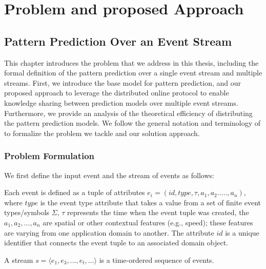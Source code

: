 \chapter{Problem and proposed Approach }
\label{chapter:system}
\section{Pattern Prediction Over an Event Stream}



This chapter introduces the problem that we address in this thesis, including the formal definition of the pattern prediction over a single event stream and multiple streams. First, we introduce the base model for pattern prediction, and our proposed approach to leverage the distributed online protocol to enable knowledge sharing between prediction models over multiple event streams. Furthermore, we provide an analysis of the theoretical efficiency of distributing the pattern prediction models.
We follow the general notation and terminology of \cite{agrawal2008efficient,schultz2009distributed,luckham2008power,alevizos2015complex,zhou_pattern_2015,kamp2014communication} to formalize the problem we tackle and our solution approach.

\subsection{Problem Formulation}

We first define the input event and the stream of events as follows:  
\begin{definition}
	Each event is defined as a tuple of attributes $e_i = (id,type,\tau,a_1,a_2.....,a_n)$, where $type$ is the event type attribute that takes a value from a set of finite event types/symbols $\Sigma$, $\tau$ represents the time when the event tuple was created,  the  $a_1,a_2,...,a_n$ are spatial or other contextual features (e.g., speed); these features are varying from one application domain to another. The attribute $id$ is a unique identifier that connects the event tuple to an associated domain object.
\end{definition}

\begin{definition}
A stream $s=\langle e_1,e_3,...,e_t,...\rangle$  is a time-ordered sequence of events.
\end{definition}


